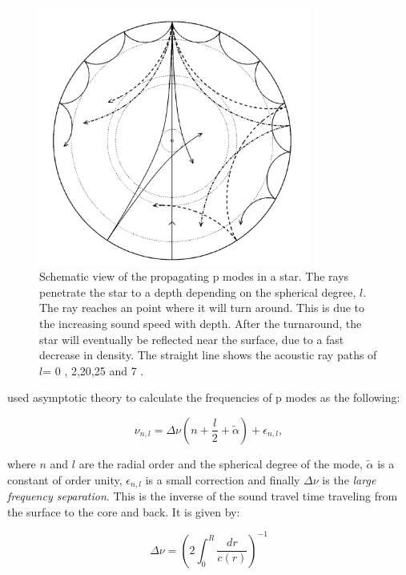 \begin{figure}[t]
    \centering
    \includegraphics[width=0.8\textwidth]{propagationrays.png}
    \caption{Schematic view of the propagating p modes in a star. The rays penetrate the star to a depth depending  on the spherical degree, $l$. The ray reaches an point where it will turn around. This is due to the increasing sound speed with depth. After the turnaround, the star will eventually be reflected near the surface, due to a fast decrease in density. The straight line shows the acoustic ray paths of $l$= 0 , 2,20,25 and 7 \citep{aerts2010}.}
    \label{rays}
\end{figure}

\citep{shibahashi1979modal} used asymptotic theory to calculate the frequencies of p modes as the following: 

\begin{equation}
    \nu_{n,l} = \Delta\nu\left(n+\frac{l}{2}+\widetilde{\alpha}\right) + \epsilon_{n,l},
\end{equation}

\noindent where $n$ and $l$ are the radial order and the spherical degree of the mode, $\widetilde{\alpha}$ is a constant of order unity, $\epsilon_{n,l}$ is a small correction and finally $\Delta\nu$ is the \textit{large frequency separation}. This is the inverse of the sound travel time traveling from the surface to the core and back. It is given by: 

\begin{equation}
\label{deltanu}
    \Delta\nu = \left( 2\int_{0}^{R}\frac{dr}{c(r)}\right)^{-1}
\end{equation}

